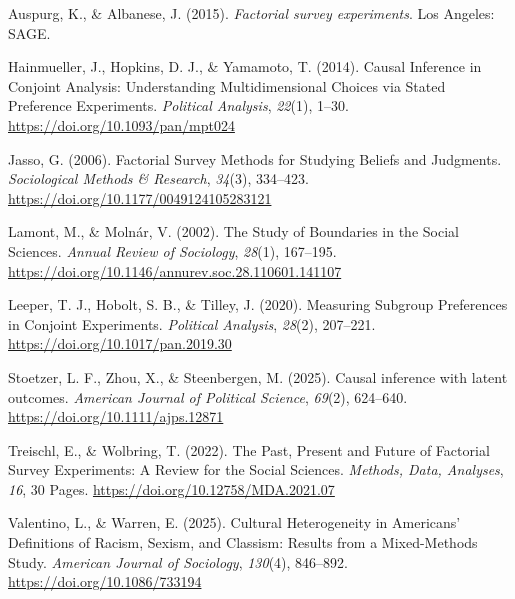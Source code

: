 \documentclass[
  13pt,
  a4paper,
]{article}
\newlength{\cslhangindent}
\newlength{\cslentryspacingunit} %
\newenvironment{CSLReferences}[2] %
 {%
  \setlength{\parindent}{0pt}
  \ifodd #1
  \let\oldpar\par
  \def\par{\hangindent=\cslhangindent\oldpar}
  \fi
  \setlength{\parskip}{#2\cslentryspacingunit}
 }%
 {}
\begin{document}
\hypertarget{refs}{}
\begin{CSLReferences}{1}{0}
\leavevmode{}%
Auspurg, K., \& Albanese, J. (2015). \emph{Factorial survey experiments}. Los Angeles: SAGE.

\leavevmode{}%
Hainmueller, J., Hopkins, D. J., \& Yamamoto, T. (2014). Causal {Inference} in {Conjoint Analysis}: {Understanding Multidimensional Choices} via {Stated Preference Experiments}. \emph{Political Analysis}, \emph{22}(1), 1--30. \url{https://doi.org/10.1093/pan/mpt024}

\leavevmode{}%
Jasso, G. (2006). Factorial {Survey Methods} for {Studying Beliefs} and {Judgments}. \emph{Sociological Methods \& Research}, \emph{34}(3), 334--423. \url{https://doi.org/10.1177/0049124105283121}

\leavevmode{}%
Lamont, M., \& Molnár, V. (2002). The {Study} of {Boundaries} in the {Social Sciences}. \emph{Annual Review of Sociology}, \emph{28}(1), 167--195. \url{https://doi.org/10.1146/annurev.soc.28.110601.141107}

\leavevmode{}%
Leeper, T. J., Hobolt, S. B., \& Tilley, J. (2020). Measuring {Subgroup Preferences} in {Conjoint Experiments}. \emph{Political Analysis}, \emph{28}(2), 207--221. \url{https://doi.org/10.1017/pan.2019.30}

\leavevmode{}%
Stoetzer, L. F., Zhou, X., \& Steenbergen, M. (2025). Causal inference with latent outcomes. \emph{American Journal of Political Science}, \emph{69}(2), 624--640. \url{https://doi.org/10.1111/ajps.12871}

\leavevmode{}%
Treischl, E., \& Wolbring, T. (2022). The {Past}, {Present} and {Future} of {Factorial Survey Experiments}: {A Review} for the {Social Sciences}. \emph{Methods, Data, Analyses}, \emph{16}, 30 Pages. \url{https://doi.org/10.12758/MDA.2021.07}

\leavevmode{}%
Valentino, L., \& Warren, E. (2025). Cultural {Heterogeneity} in {Americans}' {Definitions} of {Racism}, {Sexism}, and {Classism}: {Results} from a {Mixed-Methods Study}. \emph{American Journal of Sociology}, \emph{130}(4), 846--892. \url{https://doi.org/10.1086/733194}

\end{CSLReferences}
\end{document}
